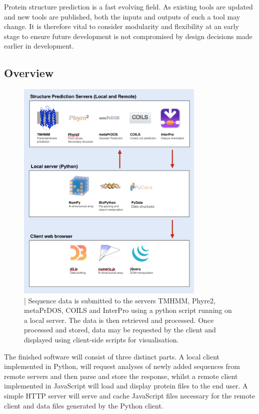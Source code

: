\documentclass[fleqn,10pt]{article} %
\begin{document}

Protein structure prediction is a fast evolving field. As existing tools are updated and new tools are published, both the inputs and outputs of such a tool may change. It is therefore vital to consider modularity and flexibility at an early stage to ensure future development is not compromised by design decisions made earlier in development.

\subsection{Overview}

\begin{figure}
\includegraphics[width=9cm]{figs/softwareoverview}
\caption{ | Sequence data is submitted to the servers TMHMM, Phyre2, metaPrDOS, COILS and InterPro using a python script running on a local server. The data is then retrieved and processed. Once processed and stored, data may be requested by the client and displayed using client-side scripts for visualisation.}
\end{figure}

The finished software will consist of three distinct parts. A local client implemented in Python, will request analyses of newly added sequences from remote servers and then parse and store the response, whilst a remote client implemented in JavaScript will load and display protein files to the end user. A simple HTTP server will serve and cache JavaScript files necessary for the remote client and data files generated by the Python client.
\end{document}
